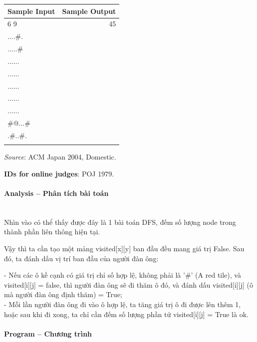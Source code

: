 \documentclass{article}
\begin{document}
\begin{table}[h]
    \centering
    \begin{tabular}{|l|r|}
        \hline
        \textbf{Sample Input} & \textbf{Sample Output} \\
        \hline
	6 9	& 45  \\ 
	....\#.	&  \\ 
	.....\#	&  \\ 
	......	&  \\ 
	......	&  \\
	......	&  \\ 
	......	&  \\ 
	......	&  \\ 
	\#@...\#	&  \\ 
	.\#..\#.	&  \\ 
		&  \\ \hline
    \end{tabular}
\end{table}

\textit{Source}: ACM Japan 2004, Domestic.

\textbf{IDs for online judges}: POJ 1979.

\paragraph{Analysis -- Phân tích bài toán} \mbox{} \\

Nhìn vào có thể thấy được đây là 1 bài toán DFS, đếm số lượng node trong thành phần liên thông hiện tại.

Vậy thì ta cần tạo một mảng visited[x][y] ban đầu đều mang giá trị False. Sau đó, ta đánh dấu vị trí ban đầu của người đàn ông:\

- Nếu các ô kề cạnh có giá trị chỉ số hợp lệ, không phải là '\#' (A red tile), và visited[i][j] = false, thì người đàn ông sẽ đi thăm ô đó, và đánh dấu visited[i][j] (ô mà người đàn ông định thăm) = True;\\
- Mỗi lần người đàn ông đi vào ô hợp lệ, ta tăng giá trị ô đi được lên thêm 1, hoặc sau khi đi xong, ta chỉ cần đếm số lượng phần tử visited[i][j] = True là ok.


\paragraph{Program -- Chương trình} \mbox{} \\
\end{document}
